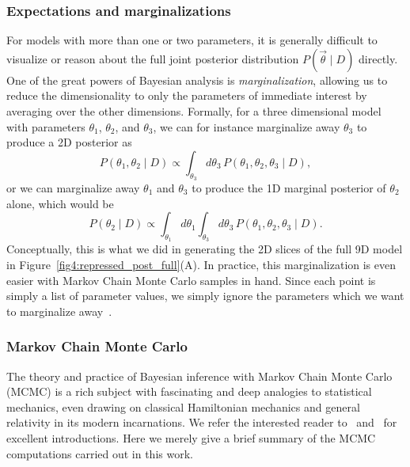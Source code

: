 \subsubsection{Expectations and marginalizations}
For models with more than one or two parameters, it is generally difficult
to visualize or reason about the full joint posterior distribution
$P(\vec{\theta} \mid D)$ directly.
One of the great powers of Bayesian analysis is \textit{marginalization},
allowing us to reduce the dimensionality to only the parameters of
immediate interest by averaging over the other dimensions.
Formally, for a three dimensional model with parameters
$\theta_1$, $\theta_2$, and $\theta_3$, we can for instance
marginalize away $\theta_3$ to produce a 2D posterior as
\begin{equation}
P(\theta_1, \theta_2 \mid D) \propto
        \int_{\theta_3} d\theta_3 \,P(\theta_1, \theta_2, \theta_3 \mid D),
\end{equation}
or we can marginalize away $\theta_1$ and $\theta_3$ to produce the
1D marginal posterior of $\theta_2$ alone, which would be
\begin{equation}
P(\theta_2 \mid D) \propto
        \int_{\theta_1} d\theta_1 \int_{\theta_3} d\theta_3
        \,P(\theta_1, \theta_2, \theta_3 \mid D).
\end{equation}
Conceptually, this is what we did in generating the 2D slices of the
full 9D model in Figure~\ref{fig4:repressed_post_full}(A).
In practice, this marginalization is even easier with Markov Chain Monte Carlo
samples in hand. Since each point is simply a list of parameter values,
we simply ignore the parameters which we want to marginalize
away~\cite{Gelman2013}.
        
\subsubsection{Markov Chain Monte Carlo}
The theory and practice of Bayesian inference with Markov Chain Monte Carlo
(MCMC) is a rich subject with fascinating and deep analogies to statistical
mechanics, even drawing on classical Hamiltonian mechanics and general
relativity in its modern incarnations. We refer the interested reader
to~\cite{Gelman2013} and~\cite{Betancourt2018} for excellent introductions.
Here we merely give a brief summary of
the MCMC computations carried out in this work.

